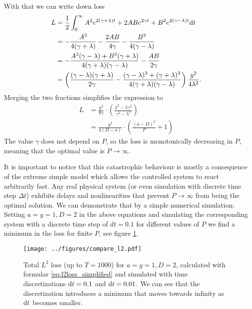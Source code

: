 \documentclass{article}
\begin{document}
    With that we can write down loss
    \begin{align}
        L &= \frac{1}{2} \int_0^{\infty} A^2 e^{2(\gamma + \lambda) t} + 2 A B e^{2\gamma t} + B^2 e^{2(\gamma - \lambda) t} \mathrm{d}t\\
          &= -\frac{A^2}{4(\gamma + \lambda)} - \frac{2 A B}{4\gamma} - \frac{B^2}{4(\gamma - \lambda)} \nonumber \\
          &= -\frac{A^2 (\gamma - \lambda) + B^2 (\gamma + \lambda)}{4(\gamma + \lambda)(\gamma - \lambda)} - \frac{A B}{2\gamma} \nonumber \\
          &= \left(\frac{(\gamma - \lambda) (\gamma + \lambda)}{2\gamma} - 
                   \frac{(\gamma - \lambda)^3 + (\gamma + \lambda)^3}{4(\gamma + \lambda)(\gamma - \lambda)}\right) 
             \frac{y^2}{4 \lambda^2}.
    \end{align}
    Merging the two fractions simplifies the expression to
    \begin{align}
        L &= \frac{y^2}{8 \gamma} \cdot \left( \frac{\lambda^2 - 5 \gamma^2}{\gamma^2 - \lambda^2}\right)\\
          &= \frac{y^2}{4 (D - a)} \cdot \left( \frac{(a - D)^2}{P} + 1\right) \label{eq:l2loss_simplified}
    \end{align}
    The value $\gamma$ does not depend on $P$, so the loss is 
    monotonically decreasing in $P$, meaning that the optimal value is $P \rightarrow \infty$.

    It is important to notice that this catastrophic behaviour is mostly a consequence of the 
    extreme simple model which allows the controlled system to react arbitrarily fast. Any 
    real physical system (or even simulation with discrete time step $\Delta t$) exhibits 
    delays and nonlinearities that prevent $P \rightarrow \infty$ from being the optimal
    solution. We can demonstrate that by a simple numerical simulation: Setting $a=y=1, D=2$
    in the above equations and simulating the corresponding system with a discrete time step
    of $dt=0.1$ for different values of $P$ we find a minimum in the loss for finite $P$, see 
    figure \ref{fig:l2_compare}.

    \begin{figure}[tb]
        \centering
        \texttt{[image: ../figures/compare\_l2.pdf]}
        \caption{Total $L^2$ loss (up to $T=1000$) for $a=y=1, 
        D=2$, calculated with formular \eqref{eq:l2loss_simplified} and simulated 
        with time discretizations $\mathrm{d}t=0.1$ and $\mathrm{d}t = 0.01$. We can see that the
        discretization introduces a minimum that moves towards infinity as $\mathrm{d}t$
        becomes smaller.}
        \label{fig:l2_compare}
    \end{figure}
\end{document}
